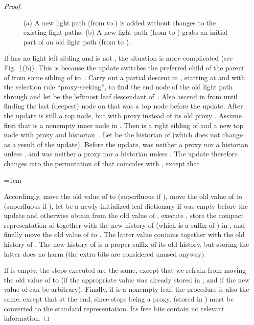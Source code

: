 \documentclass[envcountsame,envcountsect,undated,nolinenumbers]{lnthi}
\begin{document}
\begin{proof}
\begin{figure}
\begin{center}
\end{center}
\caption{(a) A new light path  (from  to )
is added without changes to the existing light paths.
(b) A new light path (from  to )
grabs an initial part of an old light path (from  to ).}
\label{fig:setcolor}
\end{figure}

If  has no light left sibling and is not ,
the situation is more complicated
(see Fig.~\ref{fig:setcolor}(b)).
This is because the update switches the
preferred child of the parent of 
from some sibling  of  to~.
Carry out a partial descent in ,
starting at  and with the
selection rule ``proxy-seeking'', to find the
end node  of the old light path through 
and let  be the leftmost leaf descendant of~.
Also ascend in  from  until finding
the last (deepest) node  on 
that was a top node before the update.
After the update  is still a top node,
but with proxy  instead of its old proxy .
Assume first that  is a nonempty inner node in .
Then  is a right sibling of  and a new top node with
proxy  and historian~.
Let  be the historian of 
(which does not change as a result of the update).
Before the update,  was neither a proxy nor a
historian unless ,
and  was neither a proxy nor a historian
unless .
The update therefore changes  into the permutation
 of  that coincides with , except that

\medskip

\centerline{\vbox{\tabskip=1em}}

\medskip
\noindent
Accordingly,
move the old value of  to  (superfluous if ),
move the old value of  to 
(superfluous if ),
let  be a newly initialized leaf dictionary
if  was empty before the update
and otherwise obtain  from the old value of ,
execute ,
store the compact representation of 
together with the new history of 
(which is a suffix of ) in ,
and finally move the old value of  to .
The latter value contains  together with the
old history of .
The new history of  is a proper suffix of its
old history, but storing the latter does no harm
(the extra bits are considered unused anyway).

If  is empty, the steps executed are the same,
except that we refrain from moving
the old value of  to 
(if  the appropriate value was already stored in ,
and if 
the new value of  can be arbitrary).
Finally, if  is a nonempty leaf,
the procedure is also the same, except that
at the end,
since  stops being a proxy, 
(stored in ) must be converted to the standard representation.
Its free bits contain no relevant information.


\end{proof}
\end{document}
